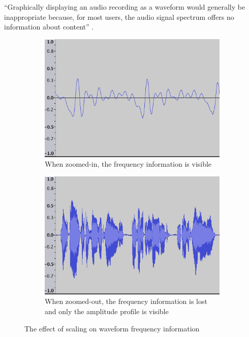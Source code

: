 ``Graphically displaying an audio recording as a waveform would generally be inappropriate because, for most users, the
audio signal spectrum offers no information about content'' \citep{Bouamrane2007}.

\begin{figure}[p]
  \centering
  \begin{subfigure}{.5\textwidth}
    \centering
    \includegraphics[width=.9\linewidth]{figs/waveform-zoomin.png}
    \caption{When zoomed-in, the frequency information is visible}
    \label{fig:waveform-zoomin}
  \end{subfigure}%
  \begin{subfigure}{.5\textwidth}
    \centering
    \includegraphics[width=.9\linewidth]{figs/waveform-zoomout.png}
    \caption{When zoomed-out, the frequency information is lost and only the amplitude profile is visible}
    \label{fig:waveform-zoomout}
  \end{subfigure}
  \caption{The effect of scaling on waveform frequency information}
  \label{fig:waveforms}
\end{figure}

